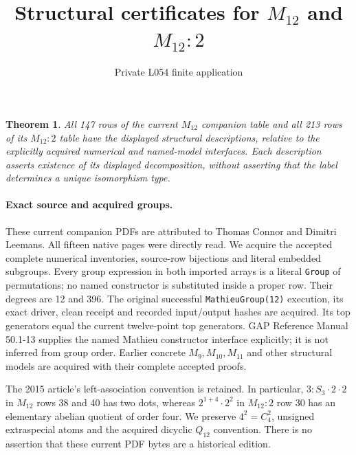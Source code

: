 \documentclass[11pt]{article}
\title{Structural certificates for $M_{12}$ and $M_{12}:2$}
\author{Private L054 finite application}\date{}
\newtheorem{theorem}{Theorem}
\begin{document}
\maketitle
\begin{theorem}
All 147 rows of the current $M_{12}$ companion table and all 213 rows of
its $M_{12}:2$ table have the displayed structural descriptions, relative
to the explicitly acquired numerical and named-model interfaces. Each
description asserts existence of its displayed decomposition, without
asserting that the label determines a unique isomorphism type.
\end{theorem}

\paragraph{Exact source and acquired groups.}
These current companion PDFs are attributed to Thomas Connor and Dimitri
Leemans. All fifteen native pages were directly read. We acquire the accepted
complete numerical inventories, source-row bijections and literal embedded
subgroups. Every group expression in both imported arrays is a literal
\texttt{Group} of permutations; no named constructor is substituted inside
a proper row. Their degrees are 12 and 396. The original successful
\texttt{MathieuGroup(12)} execution, its exact driver, clean receipt and
recorded input/output hashes are acquired. Its top generators equal the
current twelve-point top generators. GAP Reference Manual 50.1-13 supplies
the named Mathieu constructor interface explicitly; it is not inferred
from group order. Earlier concrete $M_9,M_{10},M_{11}$ and other structural
models are acquired with their complete accepted proofs.

The 2015 article's left-association convention is retained. In particular,
$3:S_3\mathbin{\cdot}2\mathbin{\cdot}2$ in $M_{12}$ rows 38 and 40 has
two dots, whereas $2^{1+4}\mathbin{\cdot}2^2$ in $M_{12}:2$ row 30 has
an elementary abelian quotient of order four. We preserve $4^2=C_4^2$,
unsigned extraspecial atoms and the acquired dicyclic $Q_{12}$ convention.
There is no assertion that these current PDF bytes are a historical edition.
\end{document}
